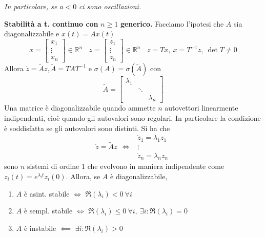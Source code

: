 \textit{In particolare, se }$a< 0$\textit{ ci sono oscillazioni.}

\textbf{Stabilità a t. continuo con }$n\geq 1$\textbf{ generico.} Facciamo l'ipotesi che $A$ sia diagonalizzabile e $\dot{x}\left(t\right) =Ax\left(t\right)$
\begin{equation*}
	x=\begin{bmatrix}
	x_1\\
	\vdots \\
	x_n
	\end{bmatrix} \in \mathbb{R}^n \ \ \ \ z=\begin{bmatrix}
	z_1\\
	\vdots \\
	z_n
	\end{bmatrix} \in \mathbb{R}^n \ \ \ \ z=Tx,\ x=T^{-1} z,\ \det T\neq 0
\end{equation*}
Allora $\dot{z} =\tilde{A} z,\tilde{A} =TAT^{-1}$ e $\sigma \left(A\right) =\sigma \left(\tilde{A}\right)$ con
\begin{equation*}
	\tilde{A} =\begin{bmatrix}
	\lambda _1 &  & \\
	& \ddots  & \\
	&  & \lambda _n
	\end{bmatrix}
\end{equation*}
Una matrice è diagonalizzabile quando ammette $n$ autovettori linearmente indipendenti, cioè quando gli autovalori sono regolari. In particolare la condizione è soddisfatta se gli autovalori sono distinti. Si ha che
\begin{equation*}
	\dot{z} =\tilde{A} z\ \ \iff \ \ \begin{array}{ c }
	\dot{z}_1 =\lambda _1 z_1\\
	\vdots \\
	\dot{z}_n =\lambda _n z_n
	\end{array}
\end{equation*}
sono $n$ sistemi di ordine $1$ che evolvono in maniera indipendente come $z_i\left(t\right) =e^{\lambda _i t} z_i\left(0\right)$. Allora, se $A$ è diagonalizzabile,
\begin{enumerate}
	\item $A$ è asint. stabile $\iff $ $\Re\left(\lambda _i\right) < 0\ \forall i$
	\item $A$ è sempl. stabile $\iff $ $\Re\left(\lambda _i\right) \leq 0\ \forall i,\ \exists i:\Re\left(\lambda _i\right) =0$
	\item $A$ è instabile $\impliedby $ $\exists i:\Re\left(\lambda _i\right)  >0$
\end{enumerate}

